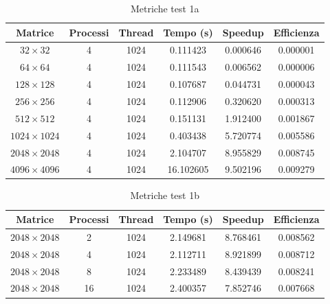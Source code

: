 \begin{table}[H]
    \centering
    \begin{tabular}{cccccc}
        \hline
        \textbf{Matrice}   & \textbf{Processi} & \textbf{Thread} & \textbf{Tempo (s)} & \textbf{Speedup} & \textbf{Efficienza} \\
        \hline
        $32 \times 32$     & 4                 & 1024            & 0.111423           & 0.000646         & 0.000001            \\
        $64 \times 64$     & 4                 & 1024            & 0.111543           & 0.006562         & 0.000006            \\
        $128 \times 128$   & 4                 & 1024            & 0.107687           & 0.044731         & 0.000043            \\
        $256 \times 256$   & 4                 & 1024            & 0.112906           & 0.320620         & 0.000313            \\
        $512 \times 512$   & 4                 & 1024            & 0.151131           & 1.912400         & 0.001867            \\
        $1024 \times 1024$ & 4                 & 1024            & 0.403438           & 5.720774         & 0.005586            \\
        $2048 \times 2048$ & 4                 & 1024            & 2.104707           & 8.955829         & 0.008745            \\
        $4096 \times 4096$ & 4                 & 1024            & 16.102605          & 9.502196         & 0.009279            \\
        \hline
    \end{tabular}
    \caption{Metriche test 1a}
\end{table}

\begin{table}[H]
    \centering
    \begin{tabular}{cccccc}
        \hline
        \textbf{Matrice}   & \textbf{Processi} & \textbf{Thread} & \textbf{Tempo (s)} & \textbf{Speedup} & \textbf{Efficienza} \\
        \hline
        $2048 \times 2048$ & 2                 & 1024            & 2.149681           & 8.768461         & 0.008562            \\
        $2048 \times 2048$ & 4                 & 1024            & 2.112711           & 8.921899         & 0.008712            \\
        $2048 \times 2048$ & 8                 & 1024            & 2.233489           & 8.439439         & 0.008241            \\
        $2048 \times 2048$ & 16                & 1024            & 2.400357           & 7.852746         & 0.007668            \\
        \hline
    \end{tabular}
    \caption{Metriche test 1b}
\end{table}

